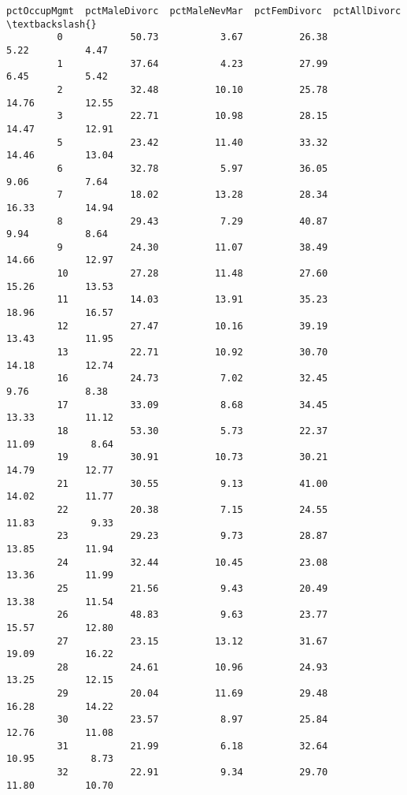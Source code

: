 \documentclass[11pt]{llncs}
\begin{document}
\begin{Verbatim}[commandchars=\\\{\}]
               pctOccupMgmt  pctMaleDivorc  pctMaleNevMar  pctFemDivorc  pctAllDivorc  \textbackslash{}
         0            50.73           3.67          26.38          5.22          4.47   
         1            37.64           4.23          27.99          6.45          5.42   
         2            32.48          10.10          25.78         14.76         12.55   
         3            22.71          10.98          28.15         14.47         12.91   
         5            23.42          11.40          33.32         14.46         13.04   
         6            32.78           5.97          36.05          9.06          7.64   
         7            18.02          13.28          28.34         16.33         14.94   
         8            29.43           7.29          40.87          9.94          8.64   
         9            24.30          11.07          38.49         14.66         12.97   
         10           27.28          11.48          27.60         15.26         13.53   
         11           14.03          13.91          35.23         18.96         16.57   
         12           27.47          10.16          39.19         13.43         11.95   
         13           22.71          10.92          30.70         14.18         12.74   
         16           24.73           7.02          32.45          9.76          8.38   
         17           33.09           8.68          34.45         13.33         11.12   
         18           53.30           5.73          22.37         11.09          8.64   
         19           30.91          10.73          30.21         14.79         12.77   
         21           30.55           9.13          41.00         14.02         11.77   
         22           20.38           7.15          24.55         11.83          9.33   
         23           29.23           9.73          28.87         13.85         11.94   
         24           32.44          10.45          23.08         13.36         11.99   
         25           21.56           9.43          20.49         13.38         11.54   
         26           48.83           9.63          23.77         15.57         12.80   
         27           23.15          13.12          31.67         19.09         16.22   
         28           24.61          10.96          24.93         13.25         12.15   
         29           20.04          11.69          29.48         16.28         14.22   
         30           23.57           8.97          25.84         12.76         11.08   
         31           21.99           6.18          32.64         10.95          8.73   
         32           22.91           9.34          29.70         11.80         10.70   

\end{Verbatim}
\end{document}
